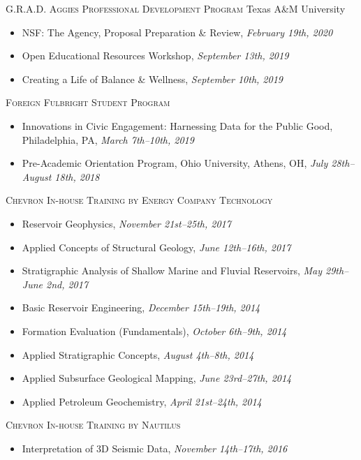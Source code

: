 \documentclass[10pt, letter]{article}
\begin{document}
\bigskip
\textsc{G.R.A.D. Aggies Professional Development Program} \hfill Texas A\&M University
\begin{itemize}[leftmargin=*]
    \item[] NSF: The Agency, Proposal Preparation \& Review, \textit{February 19th, 2020}
    \item[] Open Educational Resources Workshop, \textit{September 13th, 2019}
    \item[] Creating a Life of Balance \& Wellness, \textit{September 10th, 2019}
\end{itemize} 

\bigskip
\textsc{Foreign Fulbright Student Program}
\begin{itemize}[leftmargin=*]
    \item[] Innovations in Civic Engagement: Harnessing Data for the Public Good, Philadelphia, PA, \textit{March 7th–10th, 2019}
    \item[] Pre-Academic Orientation Program, Ohio University, Athens, OH, \textit{July 28th–August 18th, 2018}
\end{itemize} 

\bigskip
\textsc{Chevron In-house Training by Energy Company Technology}
\begin{itemize}[leftmargin=*]
    \item[] Reservoir Geophysics, \textit{November 21st–25th, 2017}
    \item[] Applied Concepts of Structural Geology, \textit{June 12th–16th, 2017}
    \item[] Stratigraphic Analysis of Shallow Marine and Fluvial Reservoirs, \textit{May 29th–June 2nd, 2017} 
    \item[] Basic Reservoir Engineering, \textit{December 15th–19th, 2014}
    \item[] Formation Evaluation (Fundamentals), \textit{October 6th–9th, 2014}
    \item[] Applied Stratigraphic Concepts, \textit{August 4th–8th, 2014}
    \item[] Applied Subsurface Geological Mapping, \textit{June 23rd–27th, 2014}
    \item[] Applied Petroleum Geochemistry, \textit{April 21st–24th, 2014}
\end{itemize} 

\bigskip
\textsc{Chevron In-house Training by Nautilus}
\begin{itemize}[leftmargin=*]
    \item[] Interpretation of 3D Seismic Data, \textit{November 14th–17th, 2016}
\end{itemize} 
\end{document}
